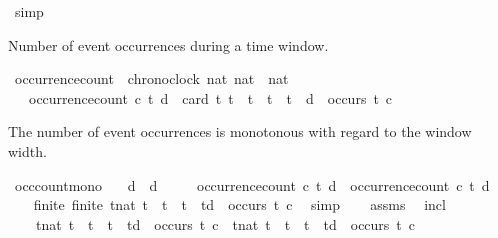 \begin{isabellebody}
\ simp\isanewline
{}\isamarkupfalse%
%
\endisatagproof
{\isafoldproof}%
%
\isadelimproof
%
\endisadelimproof
%
\begin{isamarkuptext}%
Number of event occurrences during a time window.%
\end{isamarkuptext}\isamarkuptrue%
\isamarkupfalse%
\ occurrence{\isacharunderscore}count\ {\isacharcolon}{\isacharcolon}\ {\isacartoucheopen}{\isacharbrackleft}chronoclock{\isacharcomma}\ nat{\isacharcomma}\ nat{\isacharbrackright}\ {\isasymRightarrow}\ nat{\isacartoucheclose}\isanewline
\ \ \ {\isacartoucheopen}occurrence{\isacharunderscore}count\ c\ t\ d\ {\isasymequiv}\ card\ {\isacharbraceleft}t{\isachardot}\ t\ {\isasymle}\ t\ {\isasymand}\ t\ {\isacharless}\ t\ {\isacharplus}\ d\ {\isasymand}\ occurs\ t\ c{\isacharbraceright}{\isacartoucheclose}%
\begin{isamarkuptext}%
The number of event occurrences is monotonous with regard to the window width.%
\end{isamarkuptext}\isamarkuptrue%
\isamarkupfalse%
\ occ{\isacharunderscore}count{\isacharunderscore}mono{\isacharcolon}\isanewline
\ \ \ {\isacartoucheopen}d{\isacharprime}\ {\isasymge}\ d{\isacartoucheclose}\isanewline
\ \ \ \ \ {\isacartoucheopen}occurrence{\isacharunderscore}count\ c\ t\ d{\isacharprime}\ {\isasymge}\ occurrence{\isacharunderscore}count\ c\ t\ d{\isacartoucheclose}\isanewline
%
\isadelimproof
%
\endisadelimproof
%
\isatagproof
{}\isamarkupfalse%
\ {\isacharminus}\isanewline
\ \ \isamarkupfalse%
\ finite{\isacharcolon}\ {\isacartoucheopen}finite\ {\isacharbraceleft}t{\isacharcolon}{\isacharcolon}nat{\isachardot}\ t\ {\isasymle}\ t\ {\isasymand}\ t\ {\isacharless}\ td{\isacharprime}\ {\isasymand}\ occurs\ t\ c{\isacharbraceright}{\isacartoucheclose}\ \isamarkupfalse%
\ simp\isanewline
\ \ \isamarkupfalse%
\ assms\ \isamarkupfalse%
\ incl{\isacharcolon}\isanewline
\ \ \ \ {\isacartoucheopen}{\isacharbraceleft}t{\isacharcolon}{\isacharcolon}nat{\isachardot}\ t\ {\isasymle}\ t\ {\isasymand}\ t\ {\isacharless}\ td\ {\isasymand}\ occurs\ t\ c{\isacharbraceright}\ {\isasymsubseteq}\ {\isacharbraceleft}t{\isacharcolon}{\isacharcolon}nat{\isachardot}\ t\ {\isasymle}\ t\ {\isasymand}\ t\ {\isacharless}\ td{\isacharprime}\ {\isasymand}\ occurs\ t\ c{\isacharbraceright}{\isacartoucheclose}\ \isamarkupfalse%

\end{isabellebody}
